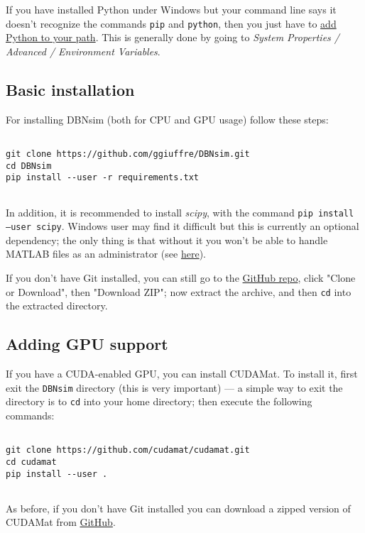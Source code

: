 \documentclass[a4paper]{article}
\begin{document}
If you have installed Python under Windows but your command line says it doesn't recognize the commands \texttt{pip} and \texttt{python}, then you just have to \href{https://www.google.com/search?q=windows+add+python+path+-pythonpath}{add Python to your path}. This is generally done by going to \emph{System Properties / Advanced / Environment Variables}.

		
	\subsection{Basic installation}

		
For installing DBNsim (both for CPU and GPU usage) follow these steps:
		\begin{verbatim}

git clone https://github.com/ggiuffre/DBNsim.git
cd DBNsim
pip install --user -r requirements.txt
		
\end{verbatim}

		
In addition, it is recommended to install \emph{scipy}, with the command \texttt{pip install --user scipy}. Windows user may find it difficult but this is currently an optional dependency; the only thing is that without it you won't be able to handle MATLAB files as an administrator (see \href{05\_admin.html}{here}).
		
If you don't have Git installed, you can still go to the \href{https://github.com/ggiuffre/DBNsim}{GitHub repo}, click "Clone or Download", then "Download ZIP"; now extract the archive, and then \texttt{cd} into the extracted directory.

		
	\subsection{Adding GPU support}

		
If you have a CUDA-enabled GPU, you can install CUDAMat. To install it, first exit the \texttt{DBNsim} directory (this is very important) --- a simple way to exit the directory is to \texttt{cd} into your home directory; then execute the following commands:
		\begin{verbatim}

git clone https://github.com/cudamat/cudamat.git
cd cudamat
pip install --user .
		
\end{verbatim}

		
As before, if you don't have Git installed you can download a zipped version of CUDAMat from \href{https://github.com/cudamat/cudamat}{GitHub}.
		
\end{document}
